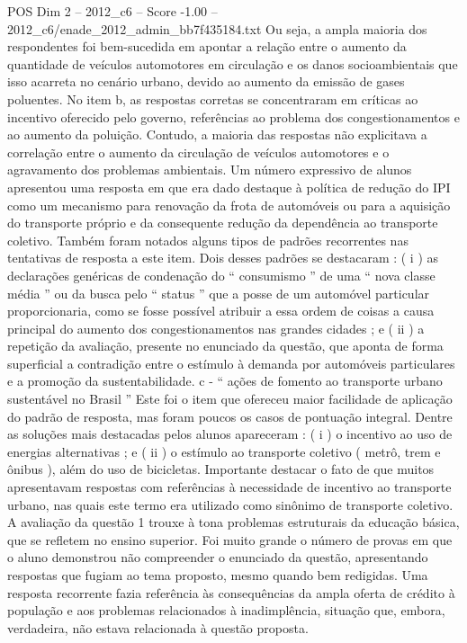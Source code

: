 \begin{textsample}{POS Dim 2 – 2012\_c6 – Score -1.00 – 2012\_c6/enade\_2012\_admin\_bb7f435184.txt}
Ou seja, a ampla maioria dos respondentes foi bem-sucedida em apontar a relação entre o aumento da quantidade de veículos automotores em circulação e os danos socioambientais que isso acarreta no cenário urbano, devido ao aumento da emissão de gases poluentes.
No item b, as respostas corretas se concentraram em críticas ao incentivo oferecido pelo governo, referências ao problema dos congestionamentos e ao aumento da poluição.
Contudo, a maioria das respostas não explicitava a correlação entre o aumento da circulação de veículos automotores e o agravamento dos problemas ambientais.
Um número expressivo de alunos apresentou uma resposta em que era dado destaque à política de redução do IPI como um mecanismo para renovação da frota de automóveis ou para a aquisição do transporte próprio e da consequente redução da dependência ao transporte coletivo.
Também foram notados alguns tipos de padrões recorrentes nas tentativas de resposta a este item.
Dois desses padrões se destacaram : ( i ) as declarações genéricas de condenação do “ consumismo ” de uma “ nova classe média ” ou da busca pelo “ status ” que a posse de um automóvel particular proporcionaria, como se fosse possível atribuir a essa ordem de coisas a causa principal do aumento dos congestionamentos nas grandes cidades ; e ( ii ) a repetição da avaliação, presente no enunciado da questão, que aponta de forma superficial a contradição entre o estímulo à demanda por automóveis particulares e a promoção da sustentabilidade. c - “ ações de fomento ao transporte urbano sustentável no Brasil ” Este foi o item que ofereceu maior facilidade de aplicação do padrão de resposta, mas foram poucos os casos de pontuação integral.
Dentre as soluções mais destacadas pelos alunos apareceram : ( i ) o incentivo ao uso de energias alternativas ; e ( ii ) o estímulo ao transporte coletivo ( metrô, trem e ônibus ), além do uso de bicicletas.
Importante destacar o fato de que muitos apresentavam respostas com referências à necessidade de incentivo ao transporte urbano, nas quais este termo era utilizado como sinônimo de transporte coletivo.
A avaliação da questão 1 trouxe à tona problemas estruturais da educação básica, que se refletem no ensino superior.
Foi muito grande o número de provas em que o aluno demonstrou não compreender o enunciado da questão, apresentando respostas que fugiam ao tema proposto, mesmo quando bem redigidas.
Uma resposta recorrente fazia referência às consequências da ampla oferta de crédito à população e aos problemas relacionados à inadimplência, situação que, embora, verdadeira, não estava relacionada à questão proposta.

\end{textsample}
